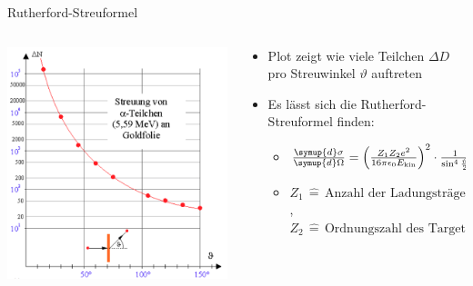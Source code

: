 \documentclass[aspectratio=1610, 9pt]{beamer}
\begin{document}
\begin{frame}{Rutherford-Streuformel}
  \begin{columns}
    \begin{column}{0.4\textwidth}
      \includegraphics[width=\textwidth]{images/Streuung.png}
    \end{column}
    \begin{column}{0.6\textwidth}
      \begin{itemize}
        \item{Plot zeigt wie viele Teilchen $\Delta D$ pro Streuwinkel $\vartheta$ auftreten}
        \item{Es lässt sich die Rutherford-Streuformel finden:}
        \begin{itemize}
        \item{$ \frac{\symup{d} \sigma}{\symup{d} \Omega } = \left( \frac{Z_\text{1}Z_\text{2} e^2}{16 \pi \epsilon_\text{0} E_\text{kin}} \right)^2 \cdot \frac{1}{\sin^4{\frac{\vartheta}{2}}} $}
        \item{$Z_\text{1} \,\hat{=}  \,\text{Anzahl der Ladungsträgern des gestreuten Teilchen} $, $Z_\text{2} \,\hat{=}  \,\text{Ordnungszahl des Targets} $}  
        \end{itemize}
      \end{itemize}
    \end{column}
  \end{columns}
\end{frame}
\end{document}
